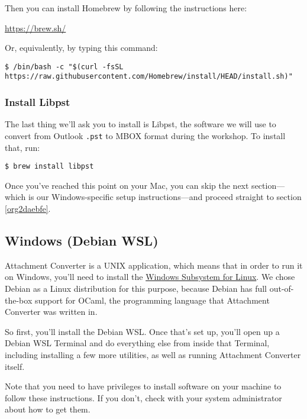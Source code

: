 \documentclass[11pt]{article}
\begin{document}
Then you can install Homebrew by following the instructions here:

\url{https://brew.sh/}

Or, equivalently, by typing this command:

\footnotesize

\begin{verbatim}
$ /bin/bash -c "$(curl -fsSL https://raw.githubusercontent.com/Homebrew/install/HEAD/install.sh)"
\end{verbatim}

\normalsize

\subsubsection{Install Libpst}
\label{sec:org1b333c0}

The last thing we'll ask you to install is Libpst, the software we
will use to convert from Outlook \texttt{.pst} to MBOX format during the
workshop.  To install that, run:

\begin{verbatim}
$ brew install libpst
\end{verbatim}

Once you've reached this point on your Mac, you can skip the next
section---which is our Windows-specific setup instructions---and
proceed straight to section \ref{org2daebfe}.

\subsection{Windows (Debian WSL) \label{org2187b56}}
\label{sec:org9df41fe}

Attachment Converter is a UNIX application, which means that in order
to run it on Windows, you'll need to install the \href{https://en.wikipedia.org/wiki/Windows\_Subsystem\_for\_Linux}{Windows Subsystem for
Linux}.  We chose Debian as a Linux distribution for this purpose,
because Debian has full out-of-the-box support for OCaml, the
programming language that Attachment Converter was written in.

So first, you'll install the Debian WSL.  Once that's set up, you'll
open up a Debian WSL Terminal and do everything else from inside that
Terminal, including installing a few more utilities, as well as
running Attachment Converter itself.

Note that you need to have privileges to install software on your
machine to follow these instructions.  If you don't, check with your
system administrator about how to get them.
\end{document}
